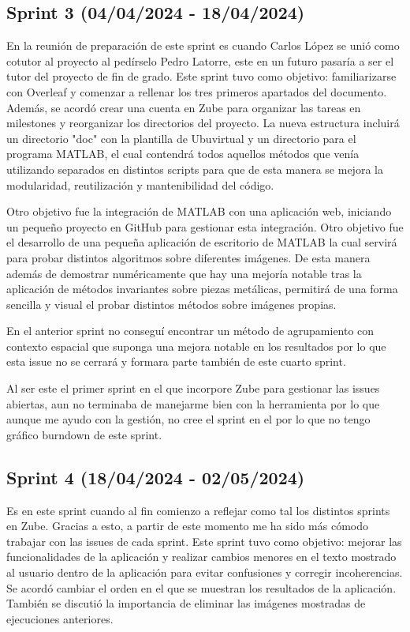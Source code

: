 \subsection{Sprint 3 (04/04/2024 - 18/04/2024)}\label{sprint-3}

En la reunión de preparación de este sprint es cuando Carlos López se unió como cotutor al proyecto al pedírselo Pedro Latorre, este en un futuro pasaría a ser el tutor del proyecto de fin de grado.
Este sprint tuvo como objetivo: familiarizarse con Overleaf y comenzar a rellenar los tres primeros apartados del documento. Además, se acordó crear una cuenta en Zube para organizar las tareas en milestones y reorganizar los directorios del proyecto. La nueva estructura incluirá un directorio "doc" con la plantilla de Ubuvirtual y un directorio para el programa MATLAB, el cual contendrá todos aquellos métodos que venía utilizando separados en distintos scripts para que de esta manera se mejora la modularidad, reutilización y mantenibilidad del código.

Otro objetivo fue la integración de MATLAB con una aplicación web, iniciando un pequeño proyecto en GitHub para gestionar esta integración.
Otro objetivo fue el desarrollo de una pequeña aplicación de escritorio de MATLAB la cual servirá para probar distintos algoritmos sobre diferentes imágenes. De esta manera además de demostrar numéricamente que hay una mejoría notable tras la aplicación de métodos invariantes sobre piezas metálicas, permitirá de una forma sencilla y visual el probar distintos métodos sobre imágenes propias.

En el anterior sprint no conseguí encontrar un método de agrupamiento con contexto espacial que suponga una mejora notable en los resultados por lo que esta issue no se cerrará y formara parte también de este cuarto sprint.

Al ser este el primer sprint en el que incorpore Zube para gestionar las issues abiertas, aun no terminaba de manejarme bien con la herramienta por lo que aunque me ayudo con la gestión, no cree el sprint en el por lo que no tengo gráfico burndown de este sprint.

\subsection{Sprint 4 (18/04/2024 - 02/05/2024)}\label{sprint-4}

Es en este sprint cuando al fin comienzo a reflejar como tal los distintos sprints en Zube. Gracias a esto, a partir de este momento me ha sido más cómodo trabajar con las issues de cada sprint.
Este sprint tuvo como objetivo: mejorar las funcionalidades de la aplicación y realizar cambios menores en el texto mostrado al usuario dentro de la aplicación para evitar confusiones y corregir incoherencias. Se acordó cambiar el orden en el que se muestran los resultados de la aplicación. También se discutió la importancia de eliminar las imágenes mostradas de ejecuciones anteriores.

